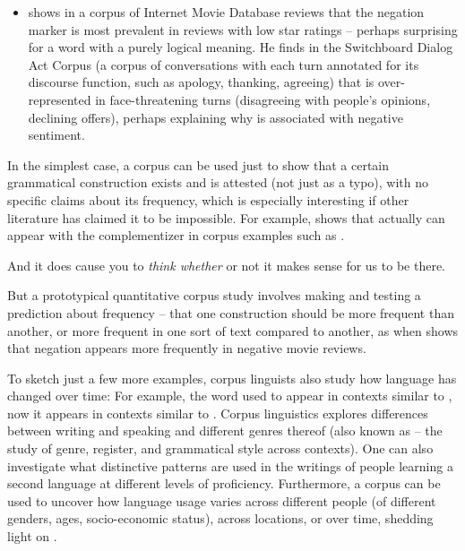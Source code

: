 \begin{itemize}
\item \citet{Potts:2010} shows in a corpus of Internet Movie Database
reviews that the negation marker  is most prevalent in reviews with low star
ratings -- perhaps surprising for a word with a purely logical
meaning.  He finds in the Switchboard Dialog Act Corpus (a corpus of
conversations with each turn annotated for its discourse function, such
as apology, thanking, agreeing) that  is
over-represented in face-threatening  turns
(disagreeing with people's opinions, declining offers), perhaps
explaining why  is associated with negative sentiment.
\end{itemize}

In the simplest case, a corpus can be used just to show that a certain
grammatical construction exists and is attested (not just as a typo),
with no specific claims about its frequency, which is especially
interesting if other literature has claimed it to be impossible. For
example, \citet[12]{White:2021} shows that  actually can
appear with the complementizer  in corpus examples
such as .

\ea \label{whether} And it does cause you to \emph{think whether} or not it makes
sense for us to be there.
\z

But a prototypical quantitative corpus
study involves making and testing a prediction about frequency -- that
one construction should be more frequent than another, or more
frequent in one sort of text compared to another, as when
\citet{Potts:2010} shows that negation appears more frequently in
negative movie reviews.

To sketch just a few more examples, corpus linguists also study how
language has changed over time: For example, the word 
used to appear in contexts similar to , now it appears
in contexts similar to  \citep{Hamilton-etal:2016}. Corpus linguistics explores
differences between writing and speaking and different genres thereof (also known as  -- the study of genre, register, and
grammatical style across contexts). One can also investigate what
distinctive patterns are used in the writings of people learning a second
language at different levels of proficiency. Furthermore, a
corpus can be used to uncover how language usage varies across
different people (of different genders, ages, socio-economic status),
across locations, or over time, shedding light on .

